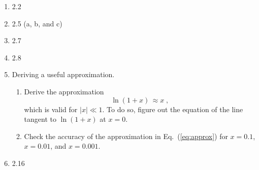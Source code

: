 \documentclass[12pt]{article}
\begin{document}
\begin{enumerate}
\setlength{\itemsep}{-1mm}
\item 2.2
\item 2.5 (a, b, and c)
\item 2.7
\item 2.8

\item Deriving a useful approximation.
  \begin{enumerate}
  \item Derive the approximation
    \begin{equation}
      \ln(1+x) \, \approx x \;,
      \label{eq:approx}
    \end{equation}
    which is valid for $|x|\ll 1$.  To do so, figure out the equation
    of the line tangent to $\ln(1+x)$ at $x=0$.
    \item Check the accuracy of the approximation in
      Eq.~(\ref{eq:approx}) for $x=0.1$, $x=0.01$, and $x=0.001$.
  \end{enumerate}

  
\item 2.16

\end{enumerate}
\end{document}
